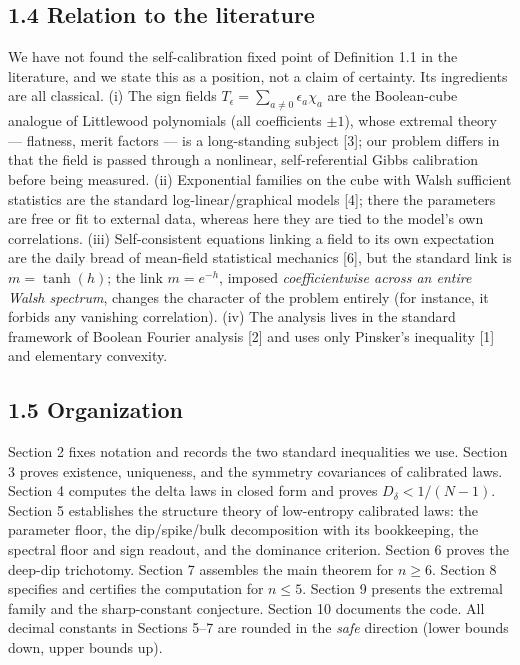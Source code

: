 \documentclass[11pt]{article}
\begin{document}
\subsection*{1.4 Relation to the literature}
We have not found the self-calibration fixed point of Definition 1.1 in the literature, and we state this as a position, not a claim of certainty.  Its ingredients are all classical.  (i) The sign fields $T_\epsilon = \sum_{a\ne0}\epsilon_a\chi_a$ are the Boolean-cube analogue of Littlewood polynomials (all coefficients $\pm1$), whose extremal theory — flatness, merit factors — is a long-standing subject [3]; our problem differs in that the field is passed through a nonlinear, self-referential Gibbs calibration before being measured. (ii) Exponential families on the cube with Walsh sufficient statistics are the standard log-linear/graphical models [4]; there the parameters are free or fit to external data, whereas here they are tied to the model's own correlations.  (iii) Self-consistent equations linking a field to its own expectation are the daily bread of mean-field statistical mechanics [6], but the standard link is $m = \tanh(h)$; the link $m = e^{-h}$, imposed \emph{coefficientwise across an entire Walsh spectrum}, changes the character of the problem entirely (for instance, it forbids any vanishing correlation).  (iv) The analysis lives in the standard framework of Boolean Fourier analysis [2] and uses only Pinsker's inequality [1] and elementary convexity.

\subsection*{1.5 Organization}
Section 2 fixes notation and records the two standard inequalities we use.  Section 3 proves existence, uniqueness, and the symmetry covariances of calibrated laws.  Section 4 computes the delta laws in closed form and proves $D_\delta < 1/(N-1)$.  Section 5 establishes the structure theory of low-entropy calibrated laws: the parameter floor, the dip/spike/bulk decomposition with its bookkeeping, the spectral floor and sign readout, and the dominance criterion.  Section 6 proves the deep-dip trichotomy.  Section 7 assembles the main theorem for $n \ge 6$.  Section 8 specifies and certifies the computation for $n \le 5$.  Section 9 presents the extremal family and the sharp-constant conjecture.  Section 10 documents the code.  All decimal constants in Sections 5–7 are rounded in the \emph{safe} direction (lower bounds down, upper bounds up).
\end{document}
